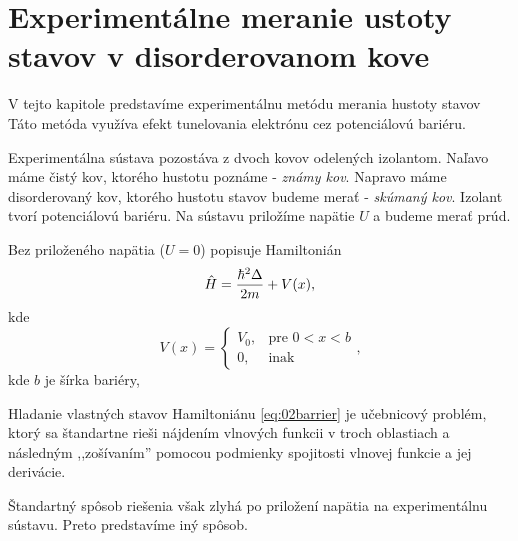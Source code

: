 \section {Experimentálne meranie ustoty stavov v disorderovanom kove}
V tejto kapitole predstavíme experimentálnu metódu merania hustoty stavov
Táto metóda využíva efekt tunelovania elektrónu cez potenciálovú bariéru.

Experimentálna sústava pozostáva z dvoch kovov odelených izolantom. Naľavo máme čistý 
kov, ktorého hustotu poznáme - {\it známy kov}. Napravo máme disorderovaný kov, ktorého 
hustotu stavov budeme merať - {\it skúmaný kov}. Izolant tvorí potenciálovú bariéru.
Na sústavu priložíme napätie  $U$ a budeme merať prúd.  

Bez priloženého napätia ($U=0$) popisuje Hamiltonián 
\begin{equation}
 \label{eq:02barrier}
 \hat{H}=\frac{\hbar^2 \Delta }{2m}+V(x) \text{,}
\end{equation} 
kde 
\begin{equation}
 \label{eq:02potential_barrier}
 V(x)=
 \begin{cases}
    V_0,& \text{pre } 0<x<b\\
    0,              & \text{inak}
\end{cases}\text{,}
\end{equation} 
kde $b$ je šírka bariéry,

Hladanie vlastných stavov Hamiltoniánu \eqref{eq:02barrier} je učebnicový problém, ktorý sa 
štandartne rieši nájdením vlnových funkcii v troch oblastiach a následným ,,zošívaním'' 
pomocou podmienky spojitosti vlnovej funkcie a jej derivácie. 

Štandartný spôsob riešenia však zlyhá po priložení napätia na experimentálnu sústavu. 
Preto predstavíme iný spôsob.

